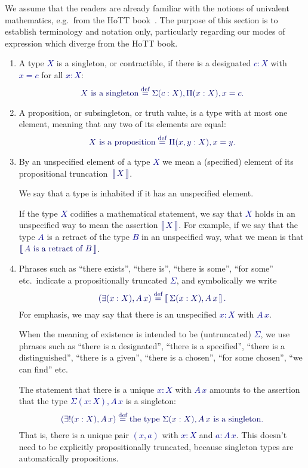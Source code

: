 \documentclass[10pt]{article}
\makeatletter
\newcommand{\db}{\textcolor{darkblue}}
\newcommand\leftcolor[2]{%
  \edef\@tempa{#1}%
  \ifx\@tempa\@empty
    \edef\@tempa{darkblue}%
  \fi
 \mathinner\bgroup\begingroup\color{\@tempa}\left#2\normalcolor%
}
\newcommand\rightcolor[2]{%
  \edef\@tempa{#1}%
  \ifx\@tempa\@empty
    \edef\@tempa{darkblue}%
  \fi
  \color{\@tempa}\right#2\endgroup\egroup%
}
\newcommand{\trunc}[1]{\leftcolor{darkblue}\llbracket\,\db{#1}\,\rightcolor{darkblue}\rrbracket}
\newcommand{\m}[1]{\db{$#1$}}
\newcommand{\M}[1]{\[\db{#1}\]}
\newcommand{\eqdef}{\overset{\text{def}}{=}}
\theoremstyle{definition}
\makeatother
\begin{document}
We assume that the readers are already familiar with the notions of
univalent mathematics, e.g.\ from the HoTT book~\cite{hottbook}. The
purpose of this section is to establish terminology and notation only,
particularly regarding our modes of expression which diverge from the HoTT
book.
\begin{enumerate}
\item A type \m{X} is a singleton, or contractible, if there is a
  designated \m{c:X} with \m{x = c} for all \m{x:X}:
  \M{
    \text{\m{X} is a singleton} \eqdef \Sigma (c : X), \Pi (x:X), x = c.
  }

\item A proposition, or subsingleton, or truth value, is a type with
  at most one element, meaning that any two of its elements are
  equal:
  \M{
  \text{\m{X} is a proposition} \eqdef \Pi(x,y:X), x=y.
  }

\item
  By an unspecified element of a type \m{X} we mean a (specified)
  element of its propositional truncation~\m{\trunc{X}}.

  We say that a type is inhabited if it has an unspecified element.

  If the type \m{X} codifies a mathematical statement, we say that
  \m{X} holds in an unspecified way to mean the assertion
  \m{\trunc{X}}. For example, if we say that the type \m{A} is a
  retract of the type \m{B} in an unspecified way, what we mean is that
  \m{\trunc{\text{\m{A} is a retract of \m{B}}}}.

\item Phrases such as ``there exists'', ``there is'', ``there is some'', ``for some'' etc.\ indicate a propositionally truncated \m{\Sigma}, and symbolically we write  \M{(\exists (x:X), A \, x) \eqdef  \trunc{\Sigma (x:X), A \, x}.}
For emphasis, we may say that there is an unspecified \m{x:X} with \m{A\,x}.

  When the meaning of existence is intended to be (untruncated)
  \m{\Sigma}, we use phrases such as ``there is a designated'', ``there
  is a specified'', ``there is a distinguished'', ``there is a given'', ``there is a chosen'', ``for some chosen'', ``we can find'' etc.

  The statement that there is a unique \m{x:X} with \m{A \, x} amounts to
  the assertion that the type \m{\Sigma (x:X), A \, x} is a singleton:
  \M{
    (\exists! (x:X), A \, x) \eqdef \text{the type \m{\Sigma (x:X), A \, x} is a singleton}.
  }
  That is, there is a unique pair \m{(x,a)} with \m{x:X} and \m{a : A\,
  x}. This doesn't need to be explicitly propositionally truncated,
  because singleton types are automatically propositions.


\end{enumerate}
\end{document}
